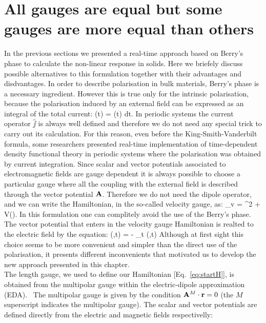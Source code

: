 \section{All gauges are equal but some gauges are more equal than others}
In the previous sections we presented a real-time approach based on Berry's phase to calculate the non-linear response in solids. Here we briefely discuss possible alternatives to this formulation together with their advantages and disdvantages. In order to describe polarisation in bulk materials, Berry's phase is a necessary ingredient. However this is true only for the intrinsic polarisation, because the polarisation induced by an external field can be expressed as an integral of the total current:
\be
\Delta \PP (t) = \int \JJ (t) dt.
\label{intj}
\ee
In periodic systems the current operator $\hat \jj$ is always well defined  and therefore we do not need any special trick to carry out its calculation. For this reason, even before the King-Smith-Vanderbilt formula, some researchers\cite{PhysRevB.62.7998} presented real-time implementation of time-dependent density functional theory in periodic systems where the polarisation was obtained by current integration.  Since scalar and vector potentials associated to electromagnetic fields are gauge dependent\cite{Jackson02} it is always possible to choose a particular gauge where all the coupling with the external field is described through the vector potential ${\bf A}$. Therefore we do not need the dipole operator, and we can write the Hamiltonian, in the so-called velocity gauge, as:
\be
\HH_v =   \left [ \pp + \bA (\rr,t) \right ]^2 + V(\rr).
\label{velh}
\ee
In this formulation one can complitely avoid the use of the Berry's phase. The vector potential that enters in the velocity gauge Hamiltonian is realted to the electric field by the equation:
\be
\EE(\rr,t) = - \partial_t \bA(\rr,t)
\ee
Although at first sight this choice seems to be more convenient and simpler than the direct use of the polarisation, it presents different inconvenients that motivated us to develop the new approach presented in this chapter.\\
The length gauge, we used to define our Hamiltonian [Eq.~\ref{eq:startH}], is obtained from the multipolar gauge within the electric-dipole approximation (EDA).~\cite{Kobe1982}
The multipolar gauge is given by the condition ${\bf A}^{M}\cdot{\bf r}=0$ (the $M$ superscript indicates the multipolar gauge). The scalar and vector potentials are defined directly from the electric and magnetic fields respectivelly:~\cite{Kobe1982,Jackson02}  
